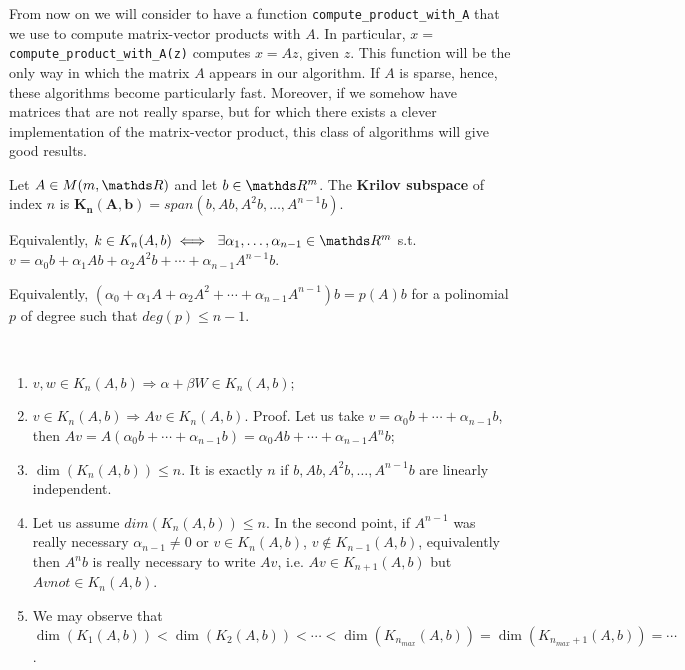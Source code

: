 \documentclass[ComputationalMathematics.tex]{subfiles}
\begin{document}
  From now on we will consider to have a function \texttt{compute\_product\_with\_A} that we use to compute matrix-vector products with $A$. In particular, $x=$\texttt{compute\_product\_with\_A(z)} computes $x =Az$, given $z$. This function will be the only way in which the matrix $A$ appears in our algorithm. If $A$ is sparse, hence, these algorithms become particularly fast. Moreover, if we somehow have matrices that are not really sparse, but for which there exists a clever implementation of the matrix-vector product, this class of algorithms will give good results.

\begin{definition}
  Let $A \in M(m, \R)$ and let $b \in \R^m$. The \textbf{Krilov subspace} of index $n$ is $\mathbf{K_n(A, b)} = span(b, Ab, A^2b, \ldots, A^{n-1}b)$.
  
  Equivalently, $k \in K_n(A, b) \iff ~ \exists \alpha_1, \ldots, \alpha_{n-1} \in \R^m$ s.t. $v= \alpha_0 b + \alpha_1 Ab + \alpha_2 A^2b + \cdots + \alpha_{n-1} A^{n-1}b$.
  
  Equivalently, $(\alpha_0 + \alpha_1A + \alpha_2A^2 + \cdots + \alpha_{n-1} A^{n-1}) b = p(A) b$ for a polinomial $p$ of degree such that $deg(p) \le n-1$.
\end{definition}

\begin{obs}[Properties]~\\
  \begin{enumerate}
    \item $v, w \in K_n(A, b) \Rightarrow \alpha + \beta W \in K_n(A, b)$;
    \item $v \in {K}_{n}(A, b) \Rightarrow Av \in {K}_{n}(A, b)$. Proof. Let us take $v = {\alpha}_{0} b + \cdots + {\alpha}_{n-1} b$, then $Av = A({\alpha}_{0} b + \cdots + {\alpha}_{n-1}b) = {\alpha}_0 Ab + \cdots + {\alpha}_{n-1} {A}^{n}b$;
    \item $\dim(K_n(A, b)) \le n$. It is exactly $n$ if $b, Ab, A^2 b, \ldots, A^{n-1} b$ are linearly independent.
    \item Let us assume $dim(K_n(A, b)) \le n$. In the second point, if $A^{n-1}$ was really necessary ${\alpha}_{n-1} \neq 0$ or $v \in {K}_{n}(A, b)$, $v \notin {K}_{n-1}(A, b)$, equivalently then ${A}^{n}b$ is really necessary to write $Av$, i.e. $Av \in {K}_{n+1}(A, b)$ but $Av not \in {K}_{n}(A, b)$.
    \item We may observe that $\dim({K}_{1} (A, b)) < \dim({K}_{2}(A, b)) < \cdots < \dim({K}_{n_{max}}(A, b)) = \dim({K}_{n_{max} + 1}(A, b)) = \cdots$.
  \end{enumerate}
  \end{obs}
\end{document}
